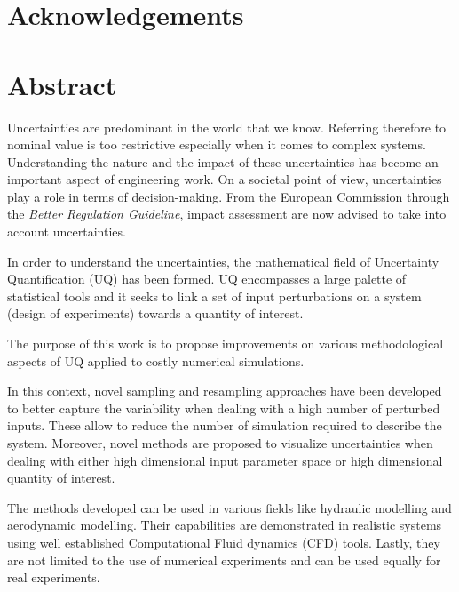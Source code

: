 
\cleardoublepage
\section*{Acknowledgements}



\newpage
\section*{Abstract}

Uncertainties are predominant in the world that we know. Referring therefore to nominal value is too restrictive especially when it comes to complex systems. Understanding the nature and the impact of these uncertainties has become an important aspect of engineering work. On a societal point of view, uncertainties play a role in terms of decision-making. From the European Commission through the \emph{Better Regulation Guideline}, impact assessment are now advised to take into account uncertainties.

In order to understand the uncertainties, the mathematical field of Uncertainty Quantification (UQ) has been formed. UQ encompasses a large palette of statistical tools and it seeks to link a set of input perturbations on a system (design of experiments) towards a quantity of interest.

The purpose of this work is to propose improvements on various methodological aspects of UQ applied to costly numerical simulations. 


In this context, novel sampling and resampling approaches have been developed to better capture the variability when dealing with a high number of perturbed inputs. These allow to reduce the number of simulation required to describe the system. Moreover, novel methods are proposed to visualize uncertainties when dealing with either high dimensional input parameter space or high dimensional quantity of interest.

The methods developed can be used in various fields like hydraulic modelling and aerodynamic modelling. Their capabilities are demonstrated in realistic systems using well established Computational Fluid dynamics (CFD) tools. Lastly, they are not limited to the use of numerical experiments and can be used equally for real experiments.\\

